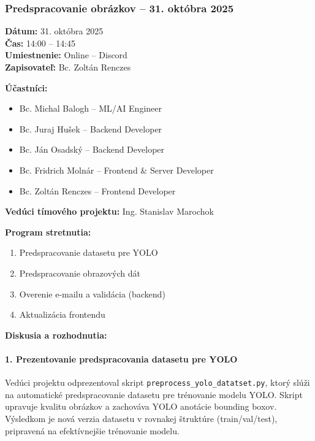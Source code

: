 \subsubsection{Predspracovanie obrázkov – 31. októbra 2025}

\textbf{Dátum:} 31. októbra 2025 \\
\textbf{Čas:} 14:00 – 14:45 \\
\textbf{Umiestnenie:} Online – Discord \\
\textbf{Zapisovateľ:} Bc. Zoltán Renczes

\vspace{0.5cm}
\textbf{Účastníci:}
\begin{itemize}
    \item Bc. Michal Balogh – ML/AI Engineer
    \item Bc. Juraj Hušek – Backend Developer
    \item Bc. Ján Osadský – Backend Developer
    \item Bc. Fridrich Molnár – Frontend \& Server Developer
    \item Bc. Zoltán Renczes – Frontend Developer
\end{itemize}

\textbf{Vedúci tímového projektu:} Ing. Stanislav Marochok

\vspace{0.5cm}
\textbf{Program stretnutia:}
\begin{enumerate}
    \item Predspracovanie datasetu pre YOLO
    \item Predspracovanie obrazových dát
    \item Overenie e-mailu a validácia (backend)
    \item Aktualizácia frontendu
\end{enumerate}

\vspace{0.5cm}
\textbf{Diskusia a rozhodnutia:}

\paragraph{1. Prezentovanie predspracovania datasetu pre YOLO}
Vedúci projektu odprezentoval skript \texttt{preprocess\_yolo\_datatset.py}, ktorý slúži na automatické predspracovanie datasetu pre trénovanie modelu YOLO. Skript upravuje kvalitu obrázkov a zachováva YOLO anotácie bounding boxov. Výsledkom je nová verzia datasetu v rovnakej štruktúre (train/val/test), pripravená na efektívnejšie trénovanie modelu.

